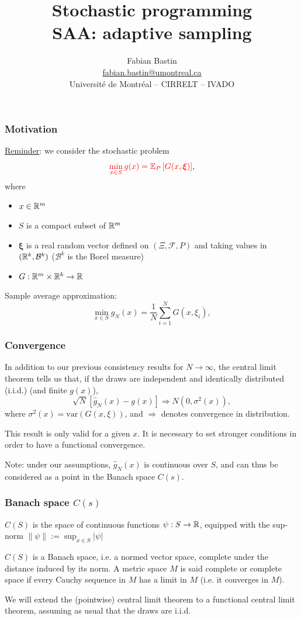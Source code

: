 \documentclass[aspectratio=169]{beamer}
\title[Adaptive methods]{Stochastic programming\\SAA: adaptive sampling}
\author[Fabian Bastin]{Fabian Bastin \\ \url{fabian.bastin@umontreal.ca} \\ Université de Montréal -- CIRRELT -- IVADO}
\date{}
\def\bxi{\boldsymbol\xi}
\begin{document}
\frame{\titlepage}

\begin{frame}
\frametitle{Motivation}

\underline{Reminder}: we consider the stochastic problem
\[
\textcolor{red}{\min_{x \in S} g(x) = \EE_P \left[ G(x, \bxi) \right]},
\]
where
\begin{itemize}
	\item
	$x \in \mathbb{R}^m$
	\item
	$S$ is a compact subset of $\mathbb{R}^m$
	\item
	$\bxi$ is a real random vector defined on $( \Xi, \mathcal{F}, P )$ and taking values in $( \mathbb{R}^k, \mathcal{B}^k )$ ($\mathcal{B}^k$ is the Borel measure)
	\item
	$G: \mathbb{R}^m \times \mathbb{R}^k \rightarrow \mathbb{R}$
\end{itemize}

Sample average approximation:
\[
\min_{x \in S} \hat{g}_N(x) = \frac{1}{N} \sum_{i = 1}^N G (x, \xi_i),
\]

\end{frame}

\begin{frame}
\frametitle{Convergence}

In addition to our previous consistency results for $N \rightarrow \infty$, the central limit theorem tells us that, if the draws are independent and identically distributed (i.i.d.) (and finite $g(x)$),
\[
\sqrt{N} [ \hat{g}_N(x) - g(x) ] \Rightarrow N(0, \sigma^2(x)),
\]
where $\sigma^2(x) = \mbox{var}(G(x,\xi))$, and $\Rightarrow$ denotes convergence in distribution.

\mbox{}

This result is only valid for a given $x$.
It is necessary to set stronger conditions in order to have a functional convergence.

\mbox{}

Note: under our assumptions, $\hat{g}_N(x)$ is continuous over $S$, and can thus be considered as a point in the Banach space $C(s)$.

\end{frame}

\begin{frame}
\frametitle{Banach space $C(s)$}

$C(S)$ is the space of continuous functions $\psi: S \rightarrow \mathbb{R}$,
equipped with the sup-norm $\| \psi \| := \sup_{x \in S}| \psi |$

\mbox{}

$C(S)$ is a Banach space, i.e. a normed vector space, complete under the distance induced by its norm.
A metric space $M$ is said complete or complete space if every Cauchy sequence in $M$ has a limit in $M$ (i.e. it converges in $M$).

\mbox{}

We will extend the (pointwise) central limit theorem to a functional central limit theorem, assuming as usual that the draws are i.i.d.

\end{frame}
\end{document}
